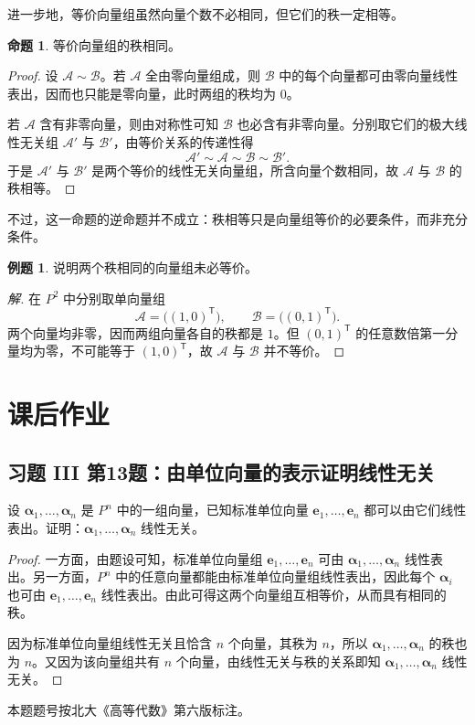\documentclass[UTF8, fontset=fandol, a4paper, 12pt]{ctexart}
\newcommand{\va}{\boldsymbol\alpha}
\theoremstyle{definition}
\newtheorem{proposition}[definition]{命题}
\newtheorem{example}[definition]{例题}
\begin{document}
进一步地，等价向量组虽然向量个数不必相同，但它们的秩一定相等。

\begin{proposition}
等价向量组的秩相同。
\end{proposition}
\begin{proof}
设 $\mathcal A\sim\mathcal B$。若 $\mathcal A$ 全由零向量组成，则 $\mathcal B$ 中的每个向量都可由零向量线性表出，因而也只能是零向量，此时两组的秩均为 $0$。

若 $\mathcal A$ 含有非零向量，则由对称性可知 $\mathcal B$ 也必含有非零向量。分别取它们的极大线性无关组 $\mathcal A'$ 与 $\mathcal B'$，由等价关系的传递性得
\[
 \mathcal A'\sim\mathcal A\sim\mathcal B\sim\mathcal B'.
\]
于是 $\mathcal A'$ 与 $\mathcal B'$ 是两个等价的线性无关向量组，所含向量个数相同，故 $\mathcal A$ 与 $\mathcal B$ 的秩相等。
\end{proof}

不过，这一命题的逆命题并不成立：秩相等只是向量组等价的必要条件，而非充分条件。

\begin{example}
说明两个秩相同的向量组未必等价。
\end{example}
\begin{proof}[解]
在 $P^2$ 中分别取单向量组
\[
 \mathcal A=\bigl((1,0)^{\mathsf T}\bigr),\qquad
 \mathcal B=\bigl((0,1)^{\mathsf T}\bigr).
\]
两个向量均非零，因而两组向量各自的秩都是 $1$。但 $(0,1)^{\mathsf T}$ 的任意数倍第一分量均为零，不可能等于 $(1,0)^{\mathsf T}$，故 $\mathcal A$ 与 $\mathcal B$ 并不等价。
\end{proof}

\section{课后作业}

\subsection{习题 III 第13题：由单位向量的表示证明线性无关}

设 $\va_1,\ldots,\va_n$ 是 $P^n$ 中的一组向量，已知标准单位向量 $\boldsymbol e_1,\ldots,\boldsymbol e_n$ 都可以由它们线性表出。证明：$\va_1,\ldots,\va_n$ 线性无关。

\begin{proof}
一方面，由题设可知，标准单位向量组 $\boldsymbol e_1,\ldots,\boldsymbol e_n$ 可由 $\va_1,\ldots,\va_n$ 线性表出。另一方面，$P^n$ 中的任意向量都能由标准单位向量组线性表出，因此每个 $\va_i$ 也可由 $\boldsymbol e_1,\ldots,\boldsymbol e_n$ 线性表出。由此可得这两个向量组互相等价，从而具有相同的秩。

因为标准单位向量组线性无关且恰含 $n$ 个向量，其秩为 $n$，所以 $\va_1,\ldots,\va_n$ 的秩也为 $n$。又因为该向量组共有 $n$ 个向量，由线性无关与秩的关系即知 $\va_1,\ldots,\va_n$ 线性无关。
\end{proof}

本题题号按北大《高等代数》第六版标注。
\end{document}
